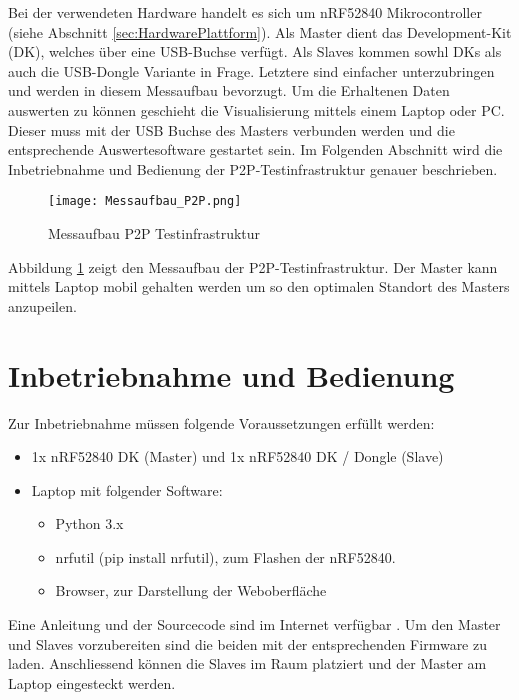Bei der verwendeten Hardware handelt es sich um nRF52840 Mikrocontroller (siehe Abschnitt \ref{sec:HardwarePlattform}). Als Master dient das Development-Kit (DK), welches über eine USB-Buchse verfügt. Als Slaves kommen sowhl DKs als auch die USB-Dongle Variante in Frage. Letztere sind einfacher unterzubringen und werden in diesem Messaufbau bevorzugt. Um die Erhaltenen Daten auswerten zu können geschieht die Visualisierung mittels einem Laptop oder PC. Dieser muss mit der USB Buchse des Masters verbunden werden und die entsprechende Auswertesoftware gestartet sein. Im Folgenden Abschnitt wird die Inbetriebnahme und Bedienung der P2P-Testinfrastruktur genauer beschrieben. 

\begin{figure} [H]
	\centering
	\texttt{[image: Messaufbau\_P2P.png]}
	\caption{Messaufbau P2P Testinfrastruktur}
	\label{fig:MessaufbauP2P}
\end{figure}

Abbildung \ref{fig:MessaufbauP2P} zeigt den Messaufbau der P2P-Testinfrastruktur. Der Master kann mittels Laptop mobil gehalten werden um so den optimalen Standort des Masters anzupeilen. 


\newpage
\section{Inbetriebnahme und Bedienung}\label{sec:InbetriebnahmeBedienungP2P}


Zur Inbetriebnahme müssen folgende Voraussetzungen erfüllt werden: 

\begin{itemize}
	\item 1x nRF52840 DK (Master) und 1x nRF52840 DK / Dongle (Slave)
	\item Laptop mit folgender Software:
	\begin{itemize}
		\item Python 3.x
		\item nrfutil (pip install nrfutil), zum Flashen der nRF52840.
		\item Browser, zur Darstellung der Weboberfläche
	\end{itemize}
\end{itemize}

Eine Anleitung und der Sourcecode sind im Internet verfügbar \cite{github_p6_software_p2p_2020}. Um den Master und Slaves vorzubereiten sind die beiden mit der entsprechenden Firmware zu laden. Anschliessend können die Slaves im Raum platziert und der Master am Laptop eingesteckt werden.  

